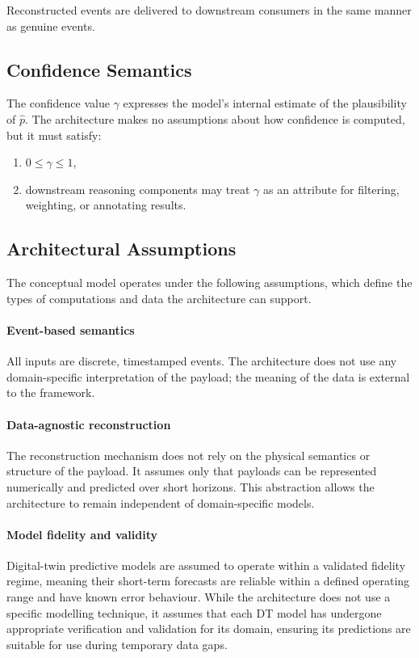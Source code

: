 Reconstructed events are delivered to downstream consumers in the same manner as genuine events.

\subsection{Confidence Semantics}

The confidence value \(\gamma\) expresses the model's internal estimate of the plausibility of \(\hat{p}\).
The architecture makes no assumptions about how confidence is computed, but it must satisfy:
\begin{enumerate}
    \item \(0 \le \gamma \le 1\),
    \item downstream reasoning components may treat \(\gamma\) as an attribute for filtering, weighting, or annotating results.
\end{enumerate}


\subsection{Architectural Assumptions}

The conceptual model operates under the following assumptions, which define the types of computations and data the architecture can support.

\paragraph*{Event-based semantics}
All inputs are discrete, timestamped events. The architecture does not use any domain-specific interpretation of the payload; the meaning of the data is external to the framework.

\paragraph*{Data-agnostic reconstruction}
The reconstruction mechanism does not rely on the physical semantics or structure of the payload. It assumes only that payloads can be represented numerically and predicted over short horizons. This abstraction allows the architecture to remain independent of domain-specific models.

\paragraph*{Model fidelity and validity}
Digital-twin predictive models are assumed to operate within a validated fidelity regime, meaning their short-term forecasts are reliable within a defined operating range and have known error behaviour. While the architecture does not use a specific modelling technique, it assumes that each DT model has undergone appropriate verification and validation for its domain, ensuring its predictions are suitable for use during temporary data gaps.


